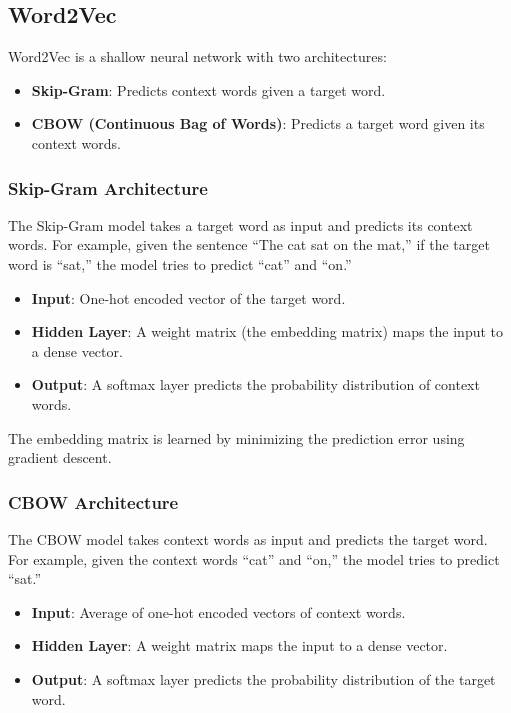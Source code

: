\begin{notechapter}
\subsection{Word2Vec}
Word2Vec is a shallow neural network with two architectures:
\begin{itemize}
    \item \textbf{Skip-Gram}: Predicts context words given a 
    target word.
    \item \textbf{CBOW (Continuous Bag of Words)}: Predicts a 
    target word given its context words.
\end{itemize}

\subsubsection{Skip-Gram Architecture}
The Skip-Gram model takes a target word as input and predicts its 
context words. For example, given the sentence ``The cat sat on 
the mat,'' if the target word is ``sat,'' the model tries to 
predict ``cat'' and ``on.''

\begin{itemize}
    \item \textbf{Input}: One-hot encoded vector of the target 
    word.
    \item \textbf{Hidden Layer}: A weight matrix (the embedding 
    matrix) maps the input to a dense vector.
    \item \textbf{Output}: A softmax layer predicts the 
    probability distribution of context words.
\end{itemize}

The embedding matrix is learned by minimizing the prediction 
error using gradient descent.

\subsubsection{CBOW Architecture}
The CBOW model takes context words as input and predicts the 
target word. For example, given the context words ``cat'' and 
``on,'' the model tries to predict ``sat.''

\begin{itemize}
    \item \textbf{Input}: Average of one-hot encoded vectors of 
    context words.
    \item \textbf{Hidden Layer}: A weight matrix maps the input 
    to a dense vector.
    \item \textbf{Output}: A softmax layer predicts the 
    probability distribution of the target word.
\end{itemize}


\end{notechapter}
